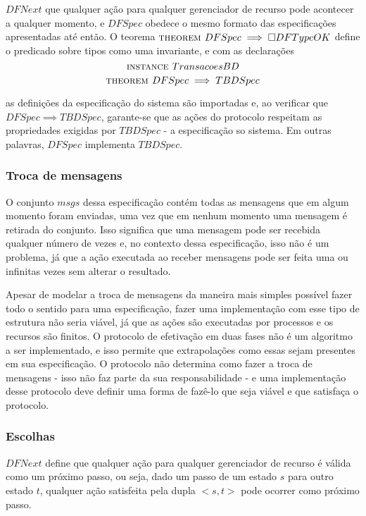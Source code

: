 $DFNext$ que qualquer ação para qualquer gerenciador de recurso pode acontecer a
qualquer momento, e $DFSpec$ obedece o mesmo formato das especificações
apresentadas até então. O teorema $\textsc{theorem } DFSpec \implies \square DFTypeOK$
define o predicado sobre tipos como uma invariante, e com as declarações
\[\textsc{instance } TransacoesBD\]
\[\textsc{theorem } DFSpec \implies TBDSpec\]

as definições da especificação do sistema são importadas e, ao verificar que
$DFSpec \implies TBDSpec$, garante-se que as ações do protocolo respeitam as
propriedades exigidas por $TBDSpec$ - a especificação so sistema. Em outras
palavras, $DFSpec$ implementa $TBDSpec$.


\subsubsection{Troca de mensagens}

O conjunto $msgs$ dessa especificação contém todas as mensagens que em algum
momento foram enviadas, uma vez que em nenhum momento uma mensagem é retirada do
conjunto. Isso significa que uma mensagem pode ser recebida qualquer número de
vezes e, no contexto dessa especificação, isso não é um problema, já que a ação
executada ao receber mensagens pode ser feita uma ou infinitas vezes sem alterar
o resultado.

Apesar de modelar a troca de mensagens da maneira mais simples possível fazer todo o sentido para uma especificação, fazer uma implementação com esse tipo de estrutura não seria viável, já que as ações são executadas por processos e os recursos são finitos. O protocolo de efetivação em duas fases não é um algoritmo a ser implementado, e isso permite que extrapolações como essas sejam presentes em sua especificação. O protocolo não determina como fazer a troca de mensagens - isso não faz parte da sua responsabilidade - e uma implementação desse protocolo deve definir uma forma de fazê-lo que seja viável e que satisfaça o protocolo.

\subsubsection{Escolhas}

$DFNext$ define que qualquer ação para qualquer gerenciador de recurso é válida
como um próximo passo, ou seja, dado um passo de um estado $s$ para outro
estado $t$, qualquer ação satisfeita pela dupla $<s, t>$ pode ocorrer como
próximo passo.

